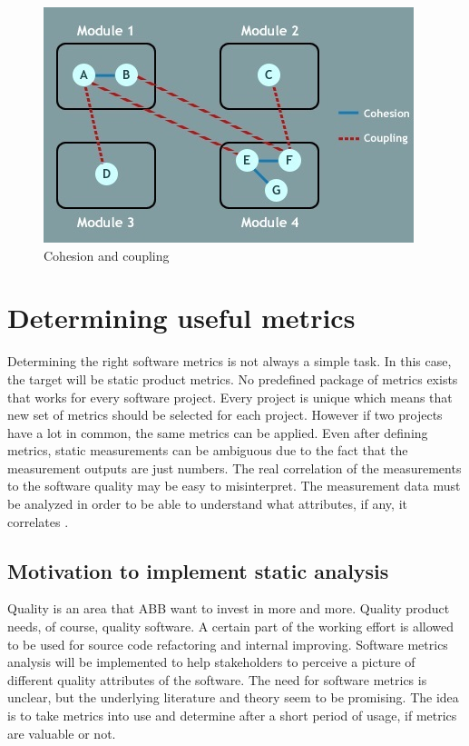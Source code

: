 \begin{figure}[t!]
\centering
\includegraphics[scale=1]{cohesioncoupling.jpg}
\caption{Cohesion and coupling \protect\cite{cohesion2013poonam}}
\label{fig:cohesioncoupling}
\end{figure}






\chapter{Determining useful metrics}

Determining the right software metrics is not always a simple task. In this case, the target will be static product metrics. No predefined package of metrics exists that works for every software project. Every project is unique which means that new set of metrics should be selected for each project. However if two projects have a lot in common, the same metrics can be applied. Even after defining metrics, static measurements can be ambiguous due to the fact that the measurement outputs are just numbers. The real correlation of the measurements to the software quality may be easy to misinterpret. The measurement data must be analyzed in order to be able to understand what attributes, if any, it correlates \cite{sommerville2011software}. 

\section{Motivation to implement static analysis}

Quality is an area that ABB want to invest in more and more. Quality product needs, of course, quality software. A certain part of the working effort is allowed to be used for source code refactoring and internal improving. Software metrics analysis will be implemented to help stakeholders to perceive a picture of different quality attributes of the software. The need for software metrics is unclear, but the underlying literature and theory seem to be promising. The idea is to take metrics into use and determine after a short period of usage, if metrics are valuable or not.

